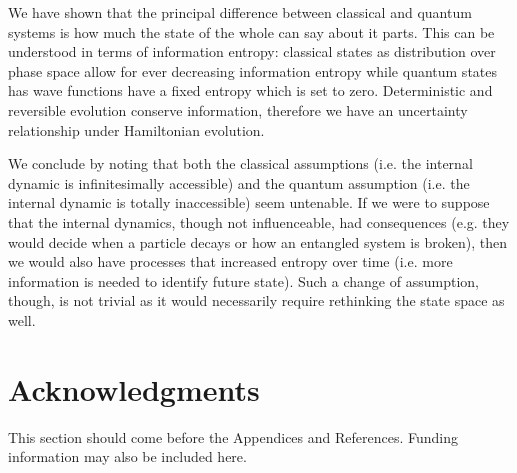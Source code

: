 \documentclass{ws-ijqi}
\begin{document}
We have shown that the principal difference between classical and quantum systems is how much the state of the whole can say about it parts. This can be understood in terms of information entropy: classical states as distribution over phase space allow for ever decreasing information entropy while quantum states has wave functions have a fixed entropy which is set to zero. Deterministic and reversible evolution conserve information, therefore we have an uncertainty relationship under Hamiltonian evolution.

We conclude by noting that both the classical assumptions (i.e. the internal dynamic is infinitesimally accessible) and the quantum assumption (i.e. the internal dynamic is totally inaccessible) seem untenable. If we were to suppose that the internal dynamics, though not influenceable, had consequences (e.g. they would decide when a particle decays or how an entangled system is broken), then we would also have processes that increased entropy over time (i.e. more information is needed to identify future state). Such a change of assumption, though, is not trivial as it would necessarily require rethinking the state space as well.

\section*{Acknowledgments}

This section should come before the Appendices and References. Funding
information may also be included here.


\renewcommand\bibname{References}



\end{document}
